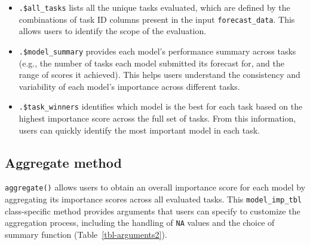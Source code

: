 \documentclass[
  article,
  shortnames,
  notitle]{jss}
\providecommand{\tightlist}{%
  \setlength{\itemsep}{0pt}\setlength{\parskip}{0pt}}
\begin{document}
\begin{itemize}
\tightlist
\item
  \texttt{.\$all\_tasks} lists all the unique tasks evaluated, which are
  defined by the combinations of task ID columns present in the input
  \texttt{forecast\_data}. This allows users to identify the scope of
  the evaluation.
\item
  \texttt{.\$model\_summary} provides each model's performance summary
  across tasks (e.g., the number of tasks each model submitted its
  forecast for, and the range of scores it achieved). This helps users
  understand the consistency and variability of each model's importance
  across different tasks.
\item
  \texttt{.\$task\_winners} identifies which model is the best for each
  task based on the highest importance score across the full set of
  tasks. From this information, users can quickly identify the most
  important model in each task.
\end{itemize}

\subsection{Aggregate method}\label{aggregate-method}

\texttt{aggregate()} allows users to obtain an overall importance score
for each model by aggregating its importance scores across all evaluated
tasks. This \texttt{model\_imp\_tbl} class-specific method provides
arguments that users can specify to customize the aggregation process,
including the handling of \texttt{NA} values and the choice of summary
function (Table~\ref{tbl-arguments2}).
\end{document}
